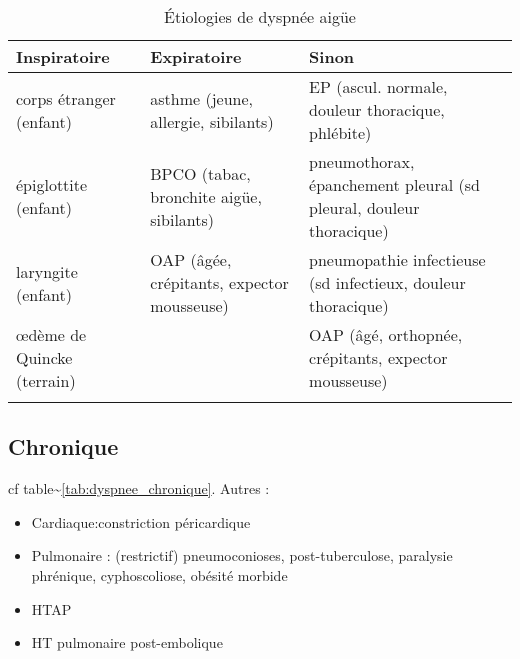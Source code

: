 \documentclass{book}
\begin{document}
\begin{table}[htbp]
\caption{Étiologies de dyspnée aigüe}
\label{tab:dyspnee_aigue}
\centering
\begin{adjustbox}{max width=\textwidth}
\begin{tabular}{lll}
\toprule
Inspiratoire & Expiratoire & Sinon\\
\midrule
corps étranger (enfant) & asthme (jeune, allergie, sibilants) & EP
                                                                (ascul. normale,
                                                                douleur
                                                                thoracique, phlébite)\\
épiglottite (enfant) & BPCO (tabac, bronchite aigüe, sibilants) & pneumothorax,
                                                                  épanchement
                                                                  pleural (sd
                                                                  pleural,
                                                                  douleur thoracique)\\
laryngite (enfant) & OAP (âgée, crépitants, expector mousseuse) & pneumopathie
                                                                  infectieuse
                                                                  (sd
                                                                  infectieux,
                                                                  douleur thoracique)\\
\oe{}dème de Quincke (terrain)&  & OAP (âgé, orthopnée, crépitants, expector mousseuse)\\
 &  & \\
\bottomrule
\end{tabular}
\end{adjustbox}
\end{table}

\subsection{Chronique}
\label{sec:orgc5316d0}
cf table\textasciitilde{}\ref{tab:dyspnee_chronique}.
Autres :

\begin{itemize}
\item Cardiaque:constriction péricardique
\item Pulmonaire : (restrictif) pneumoconioses, post-tuberculose, paralysie phrénique, cyphoscoliose, obésité morbide
\item HTAP
\item HT pulmonaire post-embolique
\end{itemize}
\end{document}
